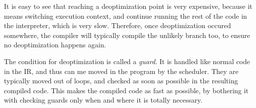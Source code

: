 \documentclass[twoside,11pt,a4paper]{article}
\newcommand{\todo}[1]{\textit{TODO: #1}}
\begin{document}
It is easy to see that reaching a deoptimization point is very expensive, because it means switching execution context, and continue running the rest of the code in the interpreter, which is very slow. Therefore, once deoptimization occured somewhere, the compiler will typically compile the unlikely branch too, to ensure no deoptimization happens again.

The condition for deoptimization is called a \textit{guard}. It is handled like normal code in the IR, and thus can me moved in the program by the scheduler. They are typically moved out of loops, and checked as soon as possible in the resulting compiled code. This makes the compiled code as fast as possible, by bothering it with checking guards only when and where it is totally necessary.


\end{document}
